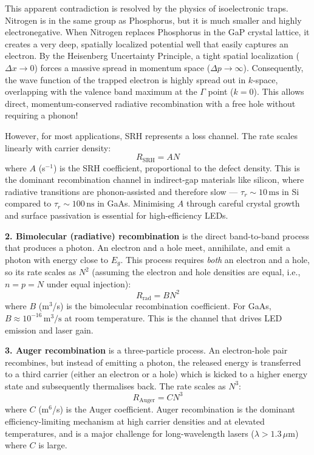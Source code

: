 This apparent contradiction is resolved by the physics of isoelectronic traps. Nitrogen is in the same group as Phosphorus, but it is much smaller and highly electronegative. When Nitrogen replaces Phosphorus in the GaP crystal lattice, it creates a very deep, spatially localized potential well that easily captures an electron. By the Heisenberg Uncertainty Principle, a tight spatial localization ($\Delta x \to 0$) forces a massive spread in momentum space ($\Delta p \to \infty$). Consequently, the wave function of the trapped electron is highly spread out in $k$-space, overlapping with the valence band maximum at the $\Gamma$ point ($k=0$). This allows direct, momentum-conserved radiative recombination with a free hole without requiring a phonon!

However, for most applications, SRH represents a loss channel. The rate scales linearly with carrier density:
\begin{equation*}
    R_\text{SRH} = AN
\end{equation*}
where $A$ (s$^{-1}$) is the SRH coefficient, proportional to the defect density. This is the dominant recombination channel in indirect-gap materials like silicon, where radiative transitions are phonon-assisted and therefore slow — $\tau_r \sim 10\,\text{ms}$ in Si compared to $\tau_r \sim 100\,\text{ns}$ in GaAs. Minimising $A$ through careful crystal growth and surface passivation is essential for high-efficiency LEDs.

\textbf{2. Bimolecular (radiative) recombination} is the direct band-to-band process that produces a photon. An electron and a hole meet, annihilate, and emit a photon with energy close to $E_g$. This process requires \emph{both} an electron and a hole, so its rate scales as $N^2$ (assuming the electron and hole densities are equal, i.e., $n = p = N$ under equal injection):
\begin{equation*}
    R_\text{rad} = BN^2
\end{equation*}
where $B$ (m$^3$/s) is the bimolecular recombination coefficient. For GaAs, $B \approx 10^{-16}\,\text{m}^3/\text{s}$ at room temperature. This is the channel that drives LED emission and laser gain.

\textbf{3. Auger recombination} is a three-particle process. An electron-hole pair recombines, but instead of emitting a photon, the released energy is transferred to a third carrier (either an electron or a hole) which is kicked to a higher energy state and subsequently thermalises back. The rate scales as $N^3$:
\begin{equation*}
    R_\text{Auger} = CN^3
\end{equation*}
where $C$ (m$^6$/s) is the Auger coefficient. Auger recombination is the dominant efficiency-limiting mechanism at high carrier densities and at elevated temperatures, and is a major challenge for long-wavelength lasers ($\lambda > 1.3\,\mu$m) where $C$ is large.

